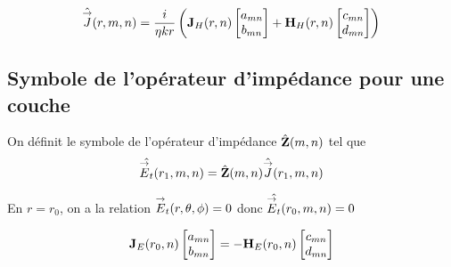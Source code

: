         \begin{equation}
            \hat{\vJ}(r,m,n) = \frac{i}{\eta k r}
            \left(
            \mJ_{H}(r,n)
            \begin{bmatrix}
                a_{mn}
                \\
                b_{mn}
            \end{bmatrix}
            +
            \mH_{H}(r,n)
            \begin{bmatrix}
                c_{mn}
                \\
                d_{mn}
            \end{bmatrix}
            \right)
        \end{equation}

    \subsection{Symbole de l'opérateur d'impédance pour une couche}

        \begin{figure}[!hbt]
          \centering
          \begin{tikzpicture}
            
          \end{tikzpicture}
        \end{figure}

        \begin{defn}
          On définit le symbole de l'opérateur d'impédance \(\hat{\mZ}(m,n)\) tel que
          \[
              \hat{\vE_t}(r_1,m,n) = \hat{\mZ}(m,n)\hat{\vJ}(r_1,m,n)
          \]
        \end{defn}

        En \(r=r_0\), on a la relation \(\vE_t(\rtp) = 0\) donc \(\hat{\vE_t}(r_0,m,n) = 0 \)

        \begin{equation}
            \mJ_{E}(r_0,n)
            \begin{bmatrix}
                a_{mn}
                \\
                b_{mn}
            \end{bmatrix}
            = -
            \mH_{E}(r_0,n)
            \begin{bmatrix}
                c_{mn}
                \\
                d_{mn}
            \end{bmatrix}
        \end{equation}

